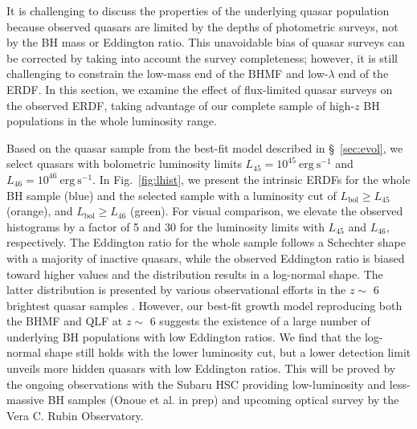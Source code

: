 \documentclass[twocolumn, twocolappendix]{aastex63}
\newcommand{\Lbol}{L_\mathrm{bol}}
\begin{document}
\begin{CJK*}{UTF8}{gbsn}
It is challenging to discuss the properties of the underlying quasar population
because observed quasars are limited by the depths of photometric surveys, not by the BH mass or Eddington ratio.
This unavoidable bias of quasar surveys can be corrected by taking into account the survey completeness;
however, it is still challenging to constrain the low-mass end of the BHMF and low-$\lambda$ end of the ERDF.
In this section, we examine the effect of flux-limited quasar surveys on the observed ERDF, 
taking advantage of our complete sample of high-$z$ BH populations in the whole luminosity range. 


Based on the quasar sample from the best-fit model described in \S~\ref{sec:evol}, 
we select quasars with bolometric luminosity limits $L_{45}=10^{45}~\mathrm{erg~s^{-1}}$ and $L_{46}=10^{46}~\mathrm{erg~s^{-1}}$.
In Fig.~\ref{fig:lhist}, we present the intrinsic ERDFs for the whole BH sample (blue)
and the selected sample with a luminosity cut of $\Lbol \geq L_{45}$ (orange),
and $\Lbol \geq L_{46}$ (green).
For visual comparison, we elevate the observed histograms by a factor of 5 and 30
for the luminosity limits with $L_{45}$ and $L_{46}$, respectively.
The Eddington ratio for the whole sample follows a Schechter shape with a majority of inactive quasars, 
while the observed Eddington ratio is biased toward higher values and the distribution results in a log-normal shape. 
The latter distribution is presented by various observational efforts in the $z\sim$ 6 brightest quasar samples 
\citep[e.g.,][]{2010AJ....140..546W,2019ApJ...873...35S,2022arXiv220705113F}.
However, our best-fit growth model reproducing both the BHMF and QLF at $z\sim$ 6 suggests the existence of
a large number of underlying BH populations with low Eddington ratios. 
We find that the log-normal shape still holds with the lower luminosity cut, 
but a lower detection limit unveils more hidden quasars with low Eddington ratios. 
This will be proved by the ongoing observations with the Subaru HSC providing low-luminosity and less-massive BH samples
(Onoue et al. in prep) and upcoming optical survey by the Vera C. Rubin Observatory.




\end{CJK*}
\end{document}
